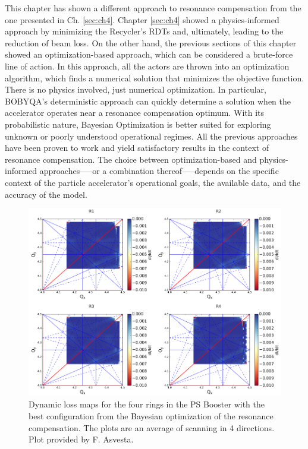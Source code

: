 This chapter has shown a different approach to resonance compensation from the one presented in Ch. \ref{sec:ch4}. Chapter \ref{sec:ch4} showed a physics-informed approach by minimizing the Recycler's RDTs and, ultimately, leading to the reduction of beam loss. On the other hand, the previous sections of this chapter showed an optimization-based approach, which can be considered a brute-force line of action. In this approach, all the actors are thrown into an optimization algorithm, which finds a numerical solution that minimizes the objective function. There is no physics involved, just numerical optimization. In particular, BOBYQA's deterministic approach can quickly determine a solution when the accelerator operates near a resonance compensation optimum. With its probabilistic nature, Bayesian Optimization is better suited for exploring unknown or poorly understood operational regimes. All the previous approaches have been proven to work and yield satisfactory results in the context of resonance compensation. The choice between optimization-based and physics-informed approaches—--or a combination thereof—--depends on the specific context of the particle accelerator's operational goals, the available data, and the accuracy of the model.

\begin{figure}[H]
    \centering
    \includegraphics[width=\columnwidth]{chapter5/bocomp.png}
    \caption{Dynamic loss maps for the four rings in the PS Booster with the best configuration from the Bayesian optimization of the resonance compensation. The plots are an average of scanning in 4 directions. Plot provided by F. Asvesta.}
    \label{fig:bocomp_psb}
\end{figure}
